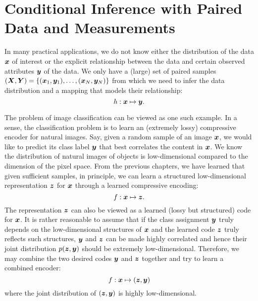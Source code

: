 \documentclass[../../book-main.tex]{subfiles}
\begin{document}
\section{Conditional Inference with Paired Data and Measurements}
In many practical applications, we do not know either the distribution of the data $\bm{x}$ of interest or the explicit relationship between the data and certain observed attributes $\bm{y}$ of the data. We only have  a (large) set of paired samples $(\bm{X}, \bm{Y}) = \{ (\bm{x}_1, \bm{y}_1), \ldots, (\bm{x}_N, \bm{y}_N) \}$ from which we need to infer the data distribution and a mapping that models their relationship:
\begin{equation}
  h: \bm{x} \mapsto \bm{y}.
\end{equation}

The problem of image classification can be viewed as one such example. In a sense, the classification problem is to learn an (extremely lossy) compressive encoder for natural images. Say, given a random sample of an image $\bm{x}$, we would like to predict its class label $\bm{y}$ that best correlates the content in $\bm{x}$. We know the distribution of natural images of objects is low-dimensional compared to the dimension of the pixel space. From the previous chapters, we have learned that given sufficient samples, in principle, we can learn a structured low-dimensional representation $\bm{z}$ for $\bm{x}$ through a learned compressive encoding:
\begin{equation}
    f: \bm{x} \mapsto \bm{z}. 
\end{equation}
The representation $\bm{z}$ can also be viewed as a learned (lossy but structured) code for $\bm{x}$. It is rather reasonable to assume that if the class assignment $\bm{y}$ truly depends on the low-dimensional structures of $\bm{x}$ and the learned code $\bm{z}$ truly reflects such structures, $\bm{y}$ and $\bm{z}$ can be made highly correlated and hence their joint distribution $p(\bm{z}, \bm{y})$ should be extremely low-dimensional. Therefore, we may combine the two desired codes $\bm{y}$ and $\bm{z}$ together and try to learn a combined encoder:
\begin{equation}
    f: \bm{x} \mapsto (\bm{z}, \bm{y}) 
\end{equation}
where the joint distribution of $(\bm{z}, \bm{y})$ is highly low-dimensional. 
\end{document}
